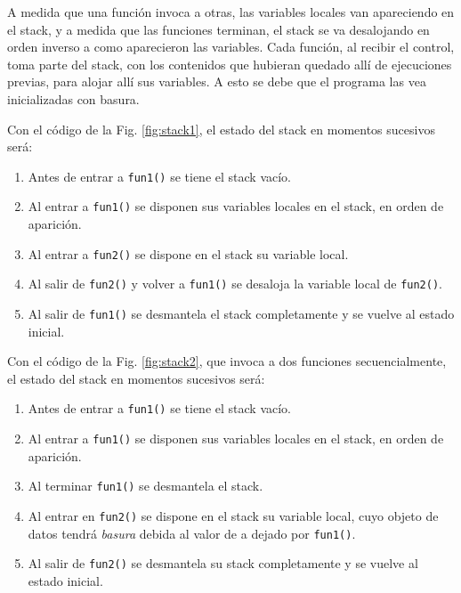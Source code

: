 A medida que una función invoca a otras, las variables locales van apareciendo en el stack, y a medida
que las funciones terminan, el stack se va desalojando en orden inverso a como aparecieron las
variables. Cada función, al recibir el control, toma parte del stack, con los contenidos que hubieran
quedado allí de ejecuciones previas, para alojar allí sus variables. A esto se debe que el programa las
vea inicializadas con basura.


\begin{ejemplo}
Con el código de la Fig. \ref{fig:stack1}, el estado del stack en momentos sucesivos será: 
\begin{enumerate}
\item Antes de entrar a \lstinline{fun1()} se tiene el stack vacío.
\item Al entrar a \lstinline{fun1()} se disponen sus variables locales en el stack, en orden de aparición.
\item Al entrar a \lstinline{fun2()} se dispone en el stack su variable local.
\item Al salir de \lstinline{fun2()} y volver a \lstinline{fun1()} se desaloja la variable local de \lstinline{fun2()}.
\item Al salir de \lstinline{fun1()} se desmantela el stack completamente y se vuelve al estado inicial.
\end{enumerate}
\end{ejemplo}

\begin{ejemplo}
Con el código de la Fig. \ref{fig:stack2}, que invoca a dos funciones secuencialmente, el estado del stack en momentos sucesivos será: 
\begin{enumerate}
\item Antes de entrar a \lstinline{fun1()} se tiene el stack vacío.
\item Al entrar a \lstinline{fun1()} se disponen sus variables locales en el stack, en orden de aparición.
\item Al terminar \lstinline{fun1()} se desmantela el stack.
\item Al entrar en \lstinline{fun2()} se dispone en el stack su variable local, cuyo objeto de datos tendrá \textit{basura} debida al valor de a dejado por \lstinline{fun1()}.
\item Al salir de \lstinline{fun2()} se desmantela su stack completamente y se vuelve al estado inicial.
\end{enumerate}
\end{ejemplo}

